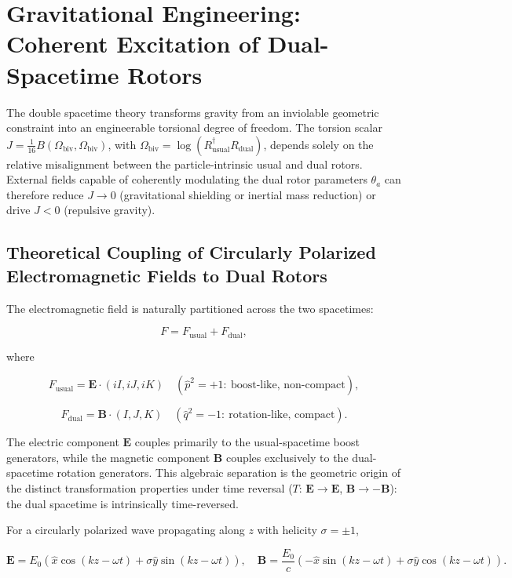 \documentclass[dvipdfmx,a4paper]{article}
\begin{document}
\section{Gravitational Engineering: Coherent Excitation of Dual-Spacetime Rotors}
\label{sec:gravitycontrol}

The double spacetime theory transforms gravity from an inviolable geometric constraint into an engineerable torsional degree of freedom. The torsion scalar $J = \frac{1}{16} B(\Omega_{\text{biv}}, \Omega_{\text{biv}})$, with $\Omega_{\text{biv}} = \log(R_{\text{usual}}^\dagger R_{\text{dual}})$, depends solely on the relative misalignment between the particle-intrinsic usual and dual rotors. External fields capable of coherently modulating the dual rotor parameters $\theta_a$ can therefore reduce $J \to 0$ (gravitational shielding or inertial mass reduction) or drive $J < 0$ (repulsive gravity).

\subsection{Theoretical Coupling of Circularly Polarized Electromagnetic Fields to Dual Rotors}

The electromagnetic field is naturally partitioned across the two spacetimes:

\[
F = F_{\text{usual}} + F_{\text{dual}},
\]

where

\[
F_{\text{usual}} = \mathbf{E} \cdot (iI, iJ, iK) \quad (\hat{p}^2 = +1:\ \text{boost-like, non-compact}),
\]

\[
F_{\text{dual}} = \mathbf{B} \cdot (I, J, K) \quad (\hat{q}^2 = -1:\ \text{rotation-like, compact}).
\]

The electric component $\mathbf{E}$ couples primarily to the usual-spacetime boost generators, while the magnetic component $\mathbf{B}$ couples exclusively to the dual-spacetime rotation generators. This algebraic separation is the geometric origin of the distinct transformation properties under time reversal ($T$: $\mathbf{E} \to \mathbf{E}$, $\mathbf{B} \to -\mathbf{B}$): the dual spacetime is intrinsically time-reversed.

For a circularly polarized wave propagating along $z$ with helicity $\sigma = \pm 1$,

\[
\mathbf{E} = E_0 (\hat{x} \cos(kz - \omega t) + \sigma \hat{y} \sin(kz - \omega t)), \quad \mathbf{B} = \frac{E_0}{c} (-\hat{x} \sin(kz - \omega t) + \sigma \hat{y} \cos(kz - \omega t)).
\]
\end{document}
